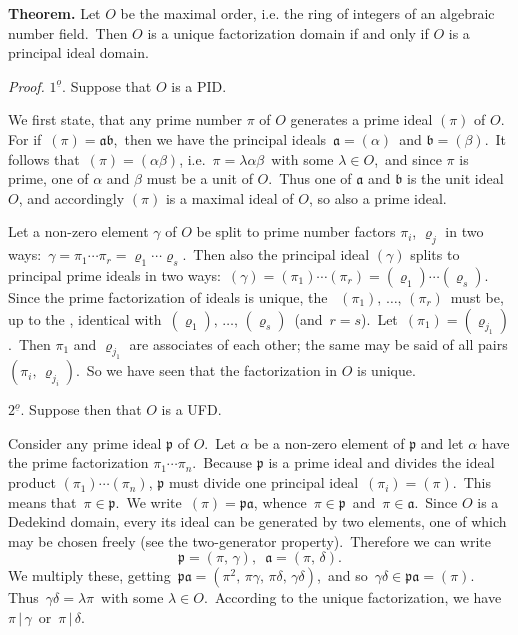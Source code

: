 \documentclass[12pt]{article}
\theoremstyle{definition}
\begin{document}
\textbf{Theorem.}\; Let $O$ be the maximal order, i.e. the ring of 
integers of an algebraic number field.\, Then $O$ is a unique 
factorization domain if and only if $O$ is a principal ideal domain.

{\em Proof.}\; $1^{\underline{o}}$.  Suppose that $O$ is a PID.

We first state, that any prime number $\pi$ of $O$ generates a 
prime ideal $(\pi)$ of $O$.\, For if\, $(\pi) = \mathfrak{ab}$,\, then we have the principal ideals\, $\mathfrak{a} = (\alpha)$\, and $\mathfrak{b} = (\beta)$.\, It follows that\, $(\pi) = (\alpha\beta)$, i.e.\, $\pi = \lambda\alpha\beta$\, with some $\lambda\in O$,\, and since $\pi$ is prime, one of $\alpha$ and $\beta$ must be a unit of $O$.\, Thus one of $\mathfrak{a}$ and $\mathfrak{b}$ is the unit ideal $O$, and accordingly $(\pi)$ is a maximal ideal of $O$, so also a prime ideal.

Let a non-zero element $\gamma$ of $O$ be split to prime number factors $\pi_i$, $\varrho_j$ in two ways:\, $\gamma = \pi_1\cdots\pi_r = \varrho_1\cdots\varrho_s$.\, Then also the principal ideal $(\gamma)$ splits to principal prime ideals in two ways:\, $(\gamma) = (\pi_1)\cdots(\pi_r) = (\varrho_1)\cdots(\varrho_s)$.\, Since the prime factorization of ideals is unique, the \, $(\pi_1),\,\ldots,\,(\pi_r)$\, must be, up to the , identical with\, $(\varrho_1),\,\ldots,\,(\varrho_s)$\, (and\, $r = s$).\, Let\, $(\pi_1) = (\varrho_{j_1})$.\, Then $\pi_1$ and $\varrho_{j_1}$ are associates of each other; the same may be said of all pairs\, $(\pi_i,\,\varrho_{j_i})$.\, So we have seen that the factorization in $O$ is unique.

$2^{\underline{o}}$.  Suppose then that $O$ is a UFD.

Consider any prime ideal $\mathfrak{p}$ of $O$.\, Let $\alpha$ be a non-zero element of $\mathfrak{p}$ and let $\alpha$ have the prime factorization $\pi_1\cdots\pi_n$.\, Because $\mathfrak{p}$ is a prime ideal and divides the ideal product $(\pi_1)\cdots(\pi_n)$, $\mathfrak{p}$ must divide one principal ideal\, $(\pi_i) = (\pi)$.\, This means that\, $\pi \in \mathfrak{p}$.\, We write\, $(\pi) = \mathfrak{pa}$, whence\, $\pi\in \mathfrak{p}$\, and\, $\pi\in \mathfrak{a}$.\, Since $O$ is a Dedekind domain, every its ideal can be generated by two elements, one of which may be chosen freely (see the two-generator property).\, Therefore we can write
$$\mathfrak{p} = (\pi,\,\gamma),\,\,\, \mathfrak{a} = (\pi,\,\delta).$$
We multiply these, getting\, 
$\mathfrak{pa} = (\pi^2,\,\pi\gamma,\,\pi\delta,\,\gamma\delta)$,\, and so\, $\gamma\delta\in \mathfrak{pa} = (\pi)$.\, Thus\, $\gamma\delta = \lambda\pi$\, with some $\lambda\in O$.\, According to the unique factorization, we have\, $\pi\,|\,\gamma$\, or\, $\pi\,|\,\delta$.
\end{document}

